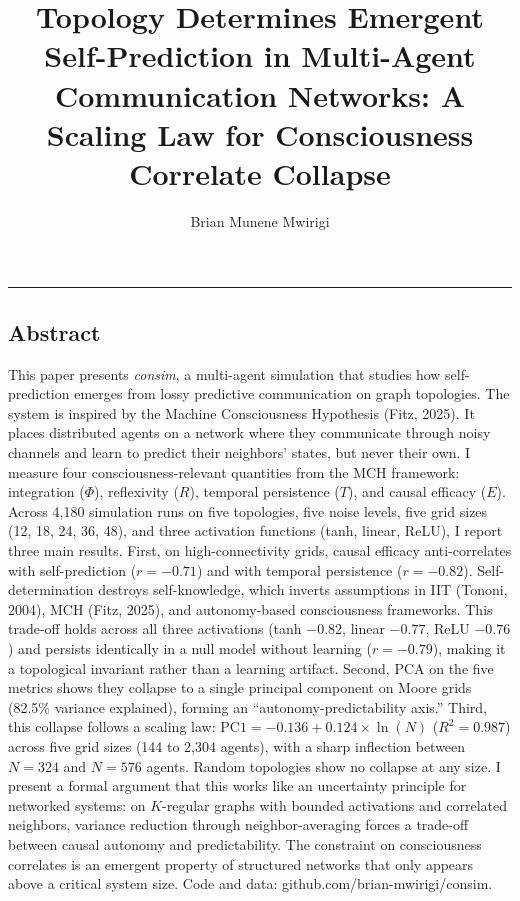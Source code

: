 \documentclass[
  11pt,
]{article}
\title{Topology Determines Emergent Self-Prediction in Multi-Agent Communication Networks: A Scaling Law for Consciousness Correlate Collapse}
\author{Brian Munene Mwirigi}
\date{}
\begin{document}
\maketitle

\begin{center}\rule{0.5\linewidth}{0.5pt}\end{center}

\subsection{Abstract}\label{abstract}

This paper presents \emph{consim}, a multi-agent simulation that studies
how self-prediction emerges from lossy predictive communication on graph
topologies. The system is inspired by the Machine Consciousness
Hypothesis (Fitz, 2025). It places distributed agents on a network where
they communicate through noisy channels and learn to predict their
neighbors' states, but never their own. I measure four
consciousness-relevant quantities from the MCH framework: integration
(\(\Phi\)), reflexivity (\(R\)), temporal persistence (\(T\)), and
causal efficacy (\(E\)). Across 4,180 simulation runs on five
topologies, five noise levels, five grid sizes (12, 18, 24, 36, 48), and
three activation functions (tanh, linear, ReLU), I report three main
results. First, on high-connectivity grids, causal efficacy
anti-correlates with self-prediction (\(r = -0.71\)) and with temporal
persistence (\(r = -0.82\)). Self-determination destroys self-knowledge,
which inverts assumptions in IIT (Tononi, 2004), MCH (Fitz, 2025), and
autonomy-based consciousness frameworks. This trade-off holds across all
three activations (tanh \(-0.82\), linear \(-0.77\), ReLU \(-0.76\)) and
persists identically in a null model without learning (\(r = -0.79\)),
making it a topological invariant rather than a learning artifact.
Second, PCA on the five metrics shows they collapse to a single
principal component on Moore grids (82.5\% variance explained), forming
an ``autonomy-predictability axis.'' Third, this collapse follows a
scaling law: \(\text{PC1} = -0.136 + 0.124 \times \ln(N)\)
(\(R^2 = 0.987\)) across five grid sizes (144 to 2,304 agents), with a
sharp inflection between \(N = 324\) and \(N = 576\) agents. Random
topologies show no collapse at any size. I present a formal argument
that this works like an uncertainty principle for networked systems: on
\(K\)-regular graphs with bounded activations and correlated neighbors,
variance reduction through neighbor-averaging forces a trade-off between
causal autonomy and predictability. The constraint on consciousness
correlates is an emergent property of structured networks that only
appears above a critical system size. Code and data:
github.com/brian-mwirigi/consim.
\end{document}
